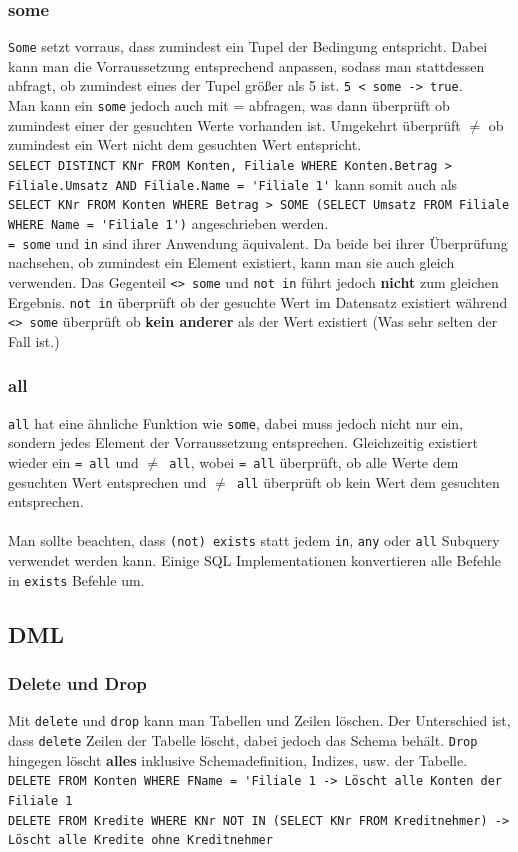 \documentclass{article}
\begin{document}
	\subsubsection{some}
	\verb|Some| setzt vorraus, dass zumindest ein Tupel der Bedingung entspricht. Dabei kann man die Vorraussetzung entsprechend anpassen, sodass man stattdessen abfragt, ob zumindest eines der Tupel größer als 5 ist. \verb|5 < some -> true|. \\
	Man kann ein \verb|some| jedoch auch mit = abfragen, was dann überprüft ob zumindest einer der gesuchten Werte vorhanden ist. Umgekehrt überprüft $\ne$ ob zumindest ein Wert nicht dem gesuchten Wert entspricht. \\
	\verb|SELECT DISTINCT KNr FROM Konten, Filiale WHERE Konten.Betrag > Filiale.Umsatz AND Filiale.Name = 'Filiale 1'| kann somit auch als \\ 
	\verb|SELECT KNr FROM Konten WHERE Betrag > SOME (SELECT Umsatz FROM Filiale WHERE Name = 'Filiale 1')| angeschrieben werden. \\
	\verb|= some| und \verb|in| sind ihrer Anwendung äquivalent. Da beide bei ihrer Überprüfung nachsehen, ob zumindest ein Element existiert, kann man sie auch gleich verwenden. Das Gegenteil \verb|<> some| und \verb|not in| führt jedoch \textbf{nicht} zum gleichen Ergebnis. \verb|not in| überprüft ob der gesuchte Wert im Datensatz existiert während \verb|<> some| überprüft ob \textbf{kein anderer} als der Wert existiert (Was sehr selten der Fall ist.)
	\subsubsection{all}
	\verb|all| hat eine ähnliche Funktion wie \verb|some|, dabei muss jedoch nicht nur ein, sondern jedes Element der Vorraussetzung entsprechen. Gleichzeitig existiert wieder ein \verb|= all| und $\ne$\verb| all|, wobei \verb|= all| überprüft, ob alle Werte dem gesuchten Wert entsprechen und $\ne$\verb| all| überprüft ob kein Wert dem gesuchten entsprechen. \\ \\
	Man sollte beachten, dass \verb|(not) exists| statt jedem \verb|in|, \verb|any| oder \verb|all| Subquery verwendet werden kann. Einige SQL Implementationen konvertieren alle Befehle in \verb|exists| Befehle um.
	\subsection{DML}
	\subsubsection{Delete und Drop}
	Mit \verb|delete| und \verb|drop| kann man Tabellen und Zeilen löschen. Der Unterschied ist, dass \verb|delete| Zeilen der Tabelle löscht, dabei jedoch das Schema behält. \verb|Drop| hingegen löscht \textbf{alles} inklusive Schemadefinition, Indizes, usw. der Tabelle. \\
	\verb|DELETE FROM Konten WHERE FName = 'Filiale 1 -> Löscht alle Konten der Filiale 1| \\
	\verb|DELETE FROM Kredite WHERE KNr NOT IN (SELECT KNr FROM Kreditnehmer) -> Löscht alle Kredite ohne Kreditnehmer| 
\end{document}
